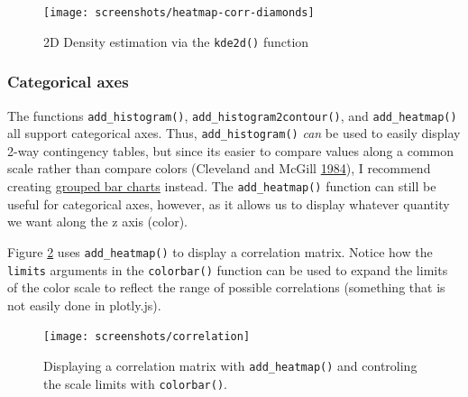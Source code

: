 \documentclass[12pt,]{isuthesis}
\newenvironment{Shaded}{\begin{snugshade}}{\end{snugshade}}
\newcommand{\KeywordTok}[1]{\textcolor[rgb]{0.13,0.29,0.53}{\textbf{{#1}}}}
\newcommand{\DataTypeTok}[1]{\textcolor[rgb]{0.13,0.29,0.53}{{#1}}}
\newcommand{\DecValTok}[1]{\textcolor[rgb]{0.00,0.00,0.81}{{#1}}}
\newcommand{\StringTok}[1]{\textcolor[rgb]{0.31,0.60,0.02}{{#1}}}
\newcommand{\NormalTok}[1]{{#1}}
\begin{document}
\begin{figure}
\centering
\texttt{[image: screenshots/heatmap-corr-diamonds]}
\caption{\label{fig:heatmap-corr-diamonds}2D Density estimation via the
\texttt{kde2d()} function}
\end{figure}

\subsubsection{Categorical axes}\label{categorical-axes}

The functions \texttt{add\_histogram()},
\texttt{add\_histogram2contour()}, and \texttt{add\_heatmap()} all
support categorical axes. Thus, \texttt{add\_histogram()} \emph{can} be
used to easily display 2-way contingency tables, but since its easier to
compare values along a common scale rather than compare colors
(Cleveland and McGill
\protect\hyperlink{ref-graphical-perception}{1984}), I recommend
creating \protect\hyperlink{multiple-discrete-distributions}{grouped bar
charts} instead. The \texttt{add\_heatmap()} function can still be
useful for categorical axes, however, as it allows us to display
whatever quantity we want along the z axis (color).

Figure \ref{fig:correlation} uses \texttt{add\_heatmap()} to display a
correlation matrix. Notice how the \texttt{limits} arguments in the
\texttt{colorbar()} function can be used to expand the limits of the
color scale to reflect the range of possible correlations (something
that is not easily done in plotly.js).

\begin{Shaded}
\end{Shaded}

\begin{figure}
\centering
\texttt{[image: screenshots/correlation]}
\caption{\label{fig:correlation}Displaying a correlation matrix with
\texttt{add\_heatmap()} and controling the scale limits with
\texttt{colorbar()}.}
\end{figure}
\end{document}
